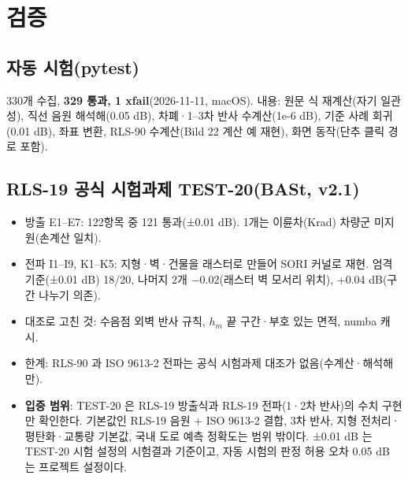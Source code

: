 \documentclass[10pt,a4paper]{article}
\begin{document}
\section{검증}
\subsection{자동 시험(pytest)}
330개 수집, \textbf{329 통과, 1 xfail}(2026-11-11, macOS). 내용: 원문 식 재계산(자기 일관성), 직선 음원 해석해(0.05 dB), 차폐·1–3차 반사 수계산(1e-6 dB), 기준 사례 회귀(0.01 dB), 좌표 변환, RLS-90 수계산(Bild 22 계산 예 재현), 화면 동작(단추 클릭 경로 포함).

\subsection{RLS-19 공식 시험과제 TEST-20(BASt, v2.1)}
\begin{itemize}
\item 방출 E1–E7: 122항목 중 121 통과(±0.01 dB). 1개는 이륜차(Krad) 차량군 미지원(손계산 일치).
\item 전파 I1–I9, K1–K5: 지형·벽·건물을 래스터로 만들어 SORI 커널로 재현. 엄격 기준(±0.01 dB) 18/20, 나머지 2개 −0.02(래스터 벽 모서리 위치), +0.04 dB(구간 나누기 의존).
\item 대조로 고친 것: 수음점 외벽 반사 규칙, $h_m$ 끝 구간·부호 있는 면적, numba 캐시.
\item 한계: RLS-90 과 ISO 9613-2 전파는 공식 시험과제 대조가 없음(수계산·해석해만).
\item \textbf{입증 범위}: TEST-20 은 RLS-19 방출식과 RLS-19 전파(1·2차 반사)의 수치 구현만 확인한다. 기본값인 RLS-19 음원 + ISO 9613-2 결합, 3차 반사, 지형 전처리·평탄화·교통량 기본값, 국내 도로 예측 정확도는 범위 밖이다. ±0.01 dB 는 TEST-20 시험 설정의 시험결과 기준이고, 자동 시험의 판정 허용 오차 0.05 dB 는 프로젝트 설정이다.
\end{itemize}
\end{document}
